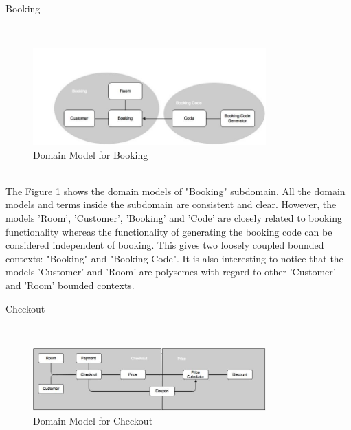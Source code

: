 \begin{shaded} Booking \end{shaded}
\\
\begin{figure}[H]
\begin{center}
\includegraphics[width=0.8\textwidth]{figures/domain-driven-design-three}
\caption{Domain Model for Booking}
\label{fig:domain_driven_design/example_scenario/subdomains/booking}
\end{center}
\end{figure}
\\
The Figure \ref{fig:domain_driven_design/example_scenario/subdomains/booking} shows the domain models of "Booking" subdomain. All the domain models and terms inside the subdomain are consistent and clear. However, the models 'Room', 'Customer', 'Booking' and 'Code' are closely related to booking functionality whereas the functionality of generating the booking code can be considered independent of booking. This gives two loosely coupled bounded contexts: "Booking" and "Booking Code". It is also interesting to notice that the models 'Customer' and 'Room' are polysemes with regard to other 'Customer' and 'Room' bounded contexts.\\
\begin{shaded} Checkout \end{shaded}
\\
\begin{figure}[H]
\begin{center}
\includegraphics[width=0.8\textwidth]{figures/domain-driven-design-four}
\caption{Domain Model for Checkout}
\label{fig:domain_driven_design/example_scenario/subdomains/checkout}
\end{center}
\end{figure}
